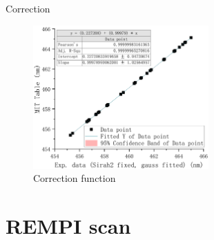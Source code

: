 \documentclass[aspectratio=43,scheme=plain,draft]{ctexbeamer}
\begin{document}
	\begin{frame}{\insertsection}{Correction}
		\begin{figure}[H]
			\centering
			\includegraphics[width=0.6\textwidth]{fitfunc.pdf}
			\caption{Correction function}
		\end{figure}
	\end{frame}
\section{REMPI scan}
\end{document}
